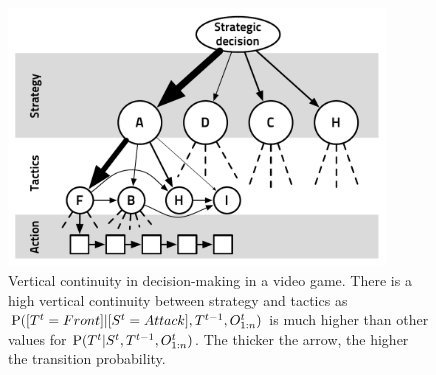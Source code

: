 \begin{figure}
\begin{center}
\includegraphics[width=10cm]{images/vertical_cont_abstract_decision_hierarchy3.pdf}
\end{center}
\caption{Vertical continuity in decision-making in a video game. There is a high vertical continuity between strategy and tactics as $\mathrm{P}([T^t=Front]|[S^t=Attack], T^{t-1}, O_{1:n}^t)$ is much higher than other values for $\mathrm{P}(T^t|S^t,T^{t-1},O_{1:n}^t)$. The thicker the arrow, the higher the transition probability.}
\label{fig:verticalcont}
\end{figure}



